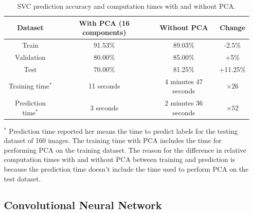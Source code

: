\documentclass{article}
\begin{document}
\begin{table}[h]
    \centering
    \begin{tabular}{|c|c|c|c|}
        \hline
        Dataset & With PCA (16 components) & Without PCA & Change \\ 
        \hline
        Train & 91.53\% & 89.03\% & -2.5\% \\ 
        Validation & 80.00\% & 85.00\% & +5\% \\ 
        Test & 70.00\% & 81.25\% & +11.25\% \\ 
        \hline
        Training time$^{*}$ & 11 seconds & 4 minutes 47 seconds & $\times 26$ \\
        Prediction time$^{*}$ & 3 seconds & 2 minutes 36 seconds & $\times 52$ \\
        \hline
    \end{tabular}
    \caption{SVC prediction accuracy and computation times with and without PCA.}
    \label{table:accuracy_pca}
\end{table}

$^{*}$ Prediction time reported her means the time to predict labels for the testing dataset of 160 images. The training time with PCA includes the time for performing PCA on the training dataset. The reason for the difference in relative computation times with and without PCA between training and prediction is because the prediction time doesn't include the time used to perform PCA on the test dataset.

\subsection*{Convolutional Neural Network}
\end{document}
